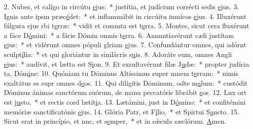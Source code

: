 2. Nubes, et calígo in circútu \uline{e}jus:~* justítia, et judícium corrécti sedis \uline{e}jus.
3. Ignis ante ipsm præc\uline{é}det:~* et inflammábit in circúitu inmícos \uline{e}jus.
4. Illuxérunt fúlgura ejus rbi t\uline{e}rræ:~* vidit et commta est t\uline{e}rra.
5. Montes, sicut cera fluxérunt a fáce D\uline{ó}mini:~* a fácie Dómin omnis t\uline{e}rra.
6. Annuntiavérunt cæli justítam \uline{e}jus:~* et vidérunt omnes pópuli glriam \uline{e}jus.
7. Confundántur omnes, qui adórnt sculpt\uline{í}lia:~* et qui gloriántur in simlácris s\uline{u}is.
8. Adoráte eum, omnes Angli \uline{e}jus:~* audívit, et lætta est S\uline{i}on.
9. Et exsultavérunt fílæ J\uline{u}dæ:~* propter judícia ta, Dóm\uline{i}ne:
10. Quóniam tu Dóminus Altíssimus super mnem t\uline{e}rram:~* nimis exaltátus es supr omnes d\uline{e}os.
11. Qui dilígitis Dóminum, odte m\uline{a}lum:~* custódit Dóminus ánimas sanctórum suórum, de manu peccatóris librábit \uline{e}os.
12. Lux ort est j\uline{u}sto,~* et rectis cord lætít\uline{i}a.
13. Lætámini, just in D\uline{ó}mino:~* et confitémini memóriæ sanctificatónis \uline{e}jus.
14. Glória Patr, et F\uline{í}lio,~* et Spirtui S\uline{a}ncto.
15. Sicut erat in princípio, et nnc, et s\uline{e}mper,~* et in sǽcula sæclórum. \uline{A}men.
